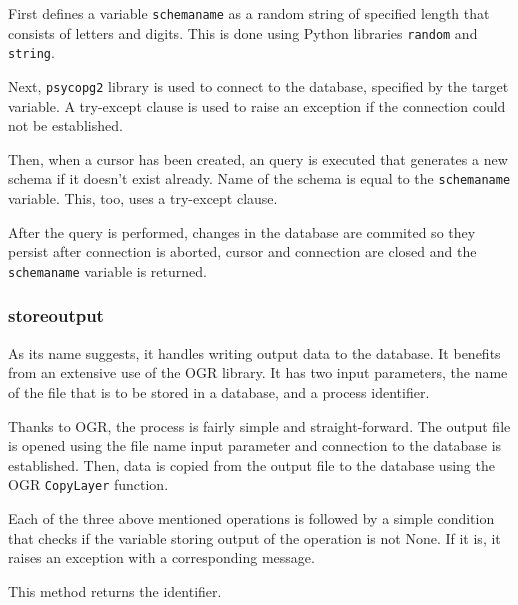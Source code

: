 First defines a variable \texttt{schema\textunderscore name} as a
random string of specified length that consists of letters and
digits. This is done using Python libraries \texttt{random} and
\texttt{string}.
 

Next, \texttt{psycopg2} library is used to connect to the database,
specified by the target variable. A try-except clause is used to raise
an exception if the connection could not be established.

Then, when a cursor has been created, an  query is executed
that generates a new schema if it doesn't exist already. Name of the
schema is equal to the \texttt{schema\textunderscore name}
variable. This, too, uses a try-except clause.

After the  query is performed, changes in the database are
commited so they persist after connection is aborted, cursor and
connection are closed and the \texttt{schema\textunderscore name}
variable is returned.

\subsubsection{\textunderscore store\textunderscore output}

As its name suggests, it handles writing output data to the
database. It benefits from an extensive use of the OGR library. It has
two input parameters, the name of the file that is to be stored in a
database, and a process identifier.

Thanks to OGR, the process is fairly simple and straight-forward. The
output file is opened using the file name input parameter and
connection to the database is established. Then, data is copied from
the output file to the database using the OGR \texttt{CopyLayer}
function.

Each of the three above mentioned operations is followed by a simple
condition that checks if the variable storing output of the operation
is not None. If it is, it raises an exception with a corresponding
message.

This method returns the identifier.


